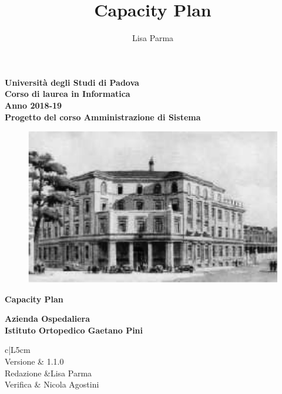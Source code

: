 \documentclass[a4paper, oneside, openany,12pt]{article}
\title{\textbf{Capacity Plan}}
\author{Lisa Parma}
\begin{document}
	
\begin{titlepage}
	\begin{center}
	
		\textbf{Università degli Studi di Padova \\ Corso di laurea in Informatica \\ Anno 2018-19 \\}
		\textbf{Progetto del corso Amministrazione di Sistema}
		\vspace{1cm}
		\begin{center}
			\begin{figure}[h!]
				\centering
				\includegraphics[width=0.5\linewidth]{./img/logo.jpg}
			\end{figure}
			\begin{Huge}
				\textbf{Capacity Plan} \\
			\end{Huge}
			\begin{Large}
				\textbf{Azienda Ospedaliera} \\
				\textbf{Istituto Ortopedico Gaetano Pini} \\
			\end{Large}
		\vspace{3cm}
	\centering
	\begin{tabular}{c|L{5cm}}
		 \\ \hline
		Versione &  1.1.0\\
		Redazione &Lisa Parma \\
		Verifica & Nicola Agostini \\
	\end{tabular}
		
	\end{center}
	\end{center}
\end{titlepage}

\tableofcontents
{}
{}
\listoftables

\newpage
\end{document}
